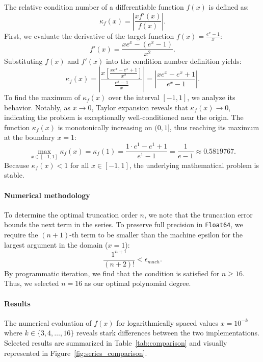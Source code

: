 \begin{solution}
	The relative condition number of a differentiable function $f(x)$ is defined
	as:
	\[
		\kappa_f(x) = \left| \frac{x f'(x)}{f(x)} \right|.
	\]
	First, we evaluate the derivative of the target function $f(x) =
		\frac{e^x-1}{x}$:
	\[
		f'(x) = \frac{x e^x - (e^x - 1)}{x^2}.
	\]
	Substituting $f(x)$ and $f'(x)$ into the condition number definition yields:
	\[
		\kappa_f(x) = \left| \frac{x \left[ \frac{x e^x - e^x + 1}{x^2}
				\right]}{\frac{e^x - 1}{x}} \right| = \left| \frac{x e^x - e^x + 1}{e^x - 1}
		\right|.
	\]
	To find the maximum of $\kappa_f(x)$ over the interval $[-1, 1]$, we analyze
	its behavior. Notably, as $x \to 0$, Taylor expansion reveals that $\kappa_f(x)
		\to 0$, indicating the problem is exceptionally well-conditioned near the
	origin. The function $\kappa_f(x)$ is monotonically increasing on $(0, 1]$, thus
	reaching its maximum at the boundary $x = 1$:
	\[
		\max_{x \in [-1, 1]} \kappa_f(x) = \kappa_f(1) = \frac{1 \cdot e^1 - e^1 +
			1}{e^1 - 1} = \frac{1}{e - 1} \approx 0.5819767.
	\]
	Because $\kappa_f(x) < 1$ for all $x \in [-1, 1]$, the underlying mathematical
	problem is stable.

	\paragraph{Numerical methodology}
	To determine the optimal truncation order $n$, we note that the truncation
	error bounds the next term in the series. To preserve full precision in
	\texttt{Float64}, we require the $(n+1)$-th term to be smaller than the machine
	epsilon for the largest argument in the domain ($x=1$):
	\[
		\frac{1^{n+1}}{(n+2)!} < \epsilon_{mach}.
	\]
	By programmatic iteration, we find that the condition is satisfied for $n \ge
		16$. Thus, we selected $n=16$ as our optimal polynomial degree.

	\paragraph{Results}
	The numerical evaluation of $f(x)$ for logarithmically spaced values $x =
			10^{-k}$ where $k \in \{3, 4, \dots, 16\}$ reveals stark differences between the
	two implementations. Selected results are summarized in
	Table~\ref{tab:comparison} and visually represented in
	Figure~\ref{fig:series_comparison}.


\end{solution}
